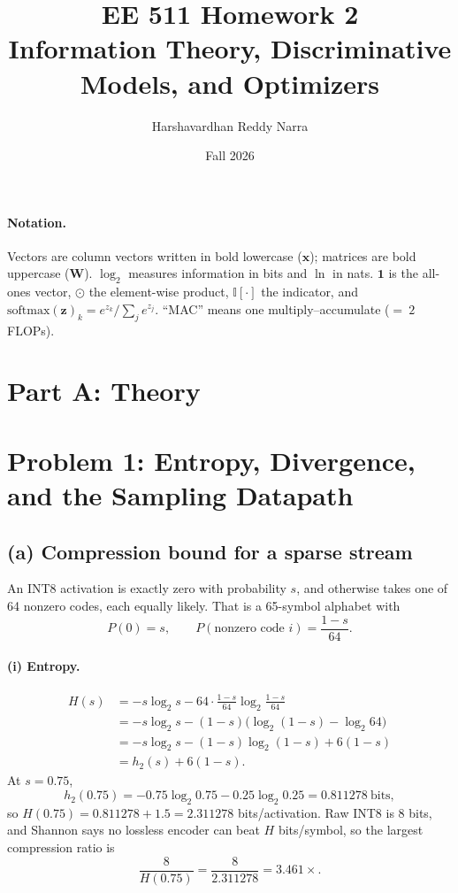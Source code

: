 \documentclass[11pt]{article}
\title{EE 511 Homework 2\\[0.4em]
\large Information Theory, Discriminative Models, and Optimizers}
\author{Harshavardhan Reddy Narra}
\date{Fall 2026}
\newcommand{\vct}[1]{\mathbf{#1}}
\newcommand{\mat}[1]{\mathbf{#1}}
\begin{document}
\maketitle

\paragraph{Notation.}
Vectors are column vectors written in bold lowercase (\(\vct{x}\));
matrices are bold uppercase (\(\mat{W}\)).
\(\log_2\) measures information in bits and \(\ln\) in nats.
\(\vct{1}\) is the all-ones vector, \(\odot\) the element-wise product,
\(\mathbb{I}[\cdot]\) the indicator, and
\(\mathrm{softmax}(\vct{z})_k = e^{z_k}/\sum_j e^{z_j}\).
``MAC'' means one multiply--accumulate (\(=\ 2\) FLOPs).

\tableofcontents
\newpage

\section*{Part A: Theory}

\section{Problem 1: Entropy, Divergence, and the Sampling Datapath}

\subsection*{(a) Compression bound for a sparse stream}

An INT8 activation is exactly zero with probability \(s\), and otherwise
takes one of 64 nonzero codes, each equally likely. That is a
65-symbol alphabet with
\[
P(0)=s,
\qquad
P(\text{nonzero code }i)=\frac{1-s}{64}.
\]

\paragraph{(i) Entropy.}
\begin{align*}
H(s)
&= -s\log_2 s
   - 64\cdot\frac{1-s}{64}\log_2\frac{1-s}{64} \\
&= -s\log_2 s
   - (1-s)\bigl(\log_2(1-s)-\log_2 64\bigr) \\
&= -s\log_2 s-(1-s)\log_2(1-s)+6(1-s) \\
&= h_2(s)+6(1-s).
\end{align*}
At \(s=0.75\),
\[
h_2(0.75)
= -0.75\log_2 0.75-0.25\log_2 0.25
= 0.811278\ \text{bits},
\]
so \(H(0.75)=0.811278+1.5=2.311278\) bits/activation.
Raw INT8 is 8 bits, and Shannon says no lossless encoder can beat
\(H\) bits/symbol, so the largest compression ratio is
\[
\frac{8}{H(0.75)}=\frac{8}{2.311278}=3.461\times.
\]
\end{document}
